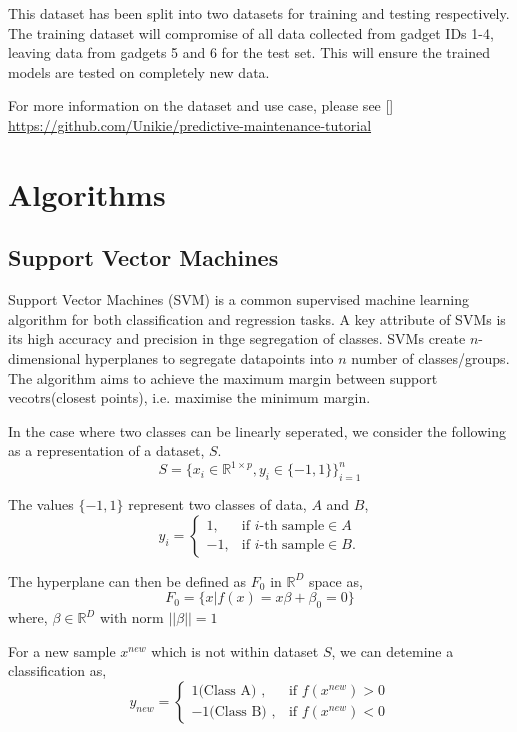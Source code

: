 \documentclass[a4paper,12pt]{report}
\newcommand{\R}{\mathbb{R}}
\begin{document}
This dataset has been split into two datasets for training and testing respectively.
The training dataset will compromise of all data collected from gadget IDs 1-4, leaving data from gadgets 5 and 6 for the test set.
This will ensure the trained models are tested on completely new data. 

For more information on the dataset and use case, please see []
\hyperlink{gitub repo}{https://github.com/Unikie/predictive-maintenance-tutorial}

\section{Algorithms}
\subsection{Support Vector Machines}
Support Vector Machines (SVM) is a common supervised machine learning algorithm for both classification and regression tasks.
A key attribute of SVMs is its high accuracy and precision in thge segregation of classes.
SVMs create $n$-dimensional hyperplanes to segregate datapoints into $n$ number of classes/groups. 
The algorithm aims to achieve the maximum margin between support vecotrs(closest points), i.e. maximise the minimum margin.

In the case where two classes can be linearly seperated, we consider the following as a representation of a dataset, $S$.
\begin{equation}
    S = \Big\{x_i \in \R^{1 \times p}, y_i \in \{-1, 1\}\Big\}^n_{i=1}
\end{equation}

The values $\{-1, 1\}$ represent two classes of data, $A$ and $B$,
\begin{equation}
    y_i = \begin{cases}
        1, & \text{if $i$} \text{-th sample} \in  A\\
        -1, & \text{if $i$} \text{-th sample} \in  B.
    \end{cases}
\end{equation}

The hyperplane can then be defined as $F_0$ in $\R^D$ space as,
\begin{equation}
    F_0 = \big \{x|f(x) = x \beta + \beta_0 = 0 \big \} 
\end{equation}  
where, 
$\beta \in \R^D$ with norm $||\beta|| = 1$

For a new sample $x^{new}$ which is not within dataset $S$, we can detemine a classification as,
\begin{equation}
    y_{new} = \begin{cases}
        1 \text{(Class A) }, & \text{if } f(x^{new}) > 0 \\
        -1 \text{(Class B) }, & \text{if } f(x^{new}) < 0
    \end{cases}
\end{equation}
\end{document}
